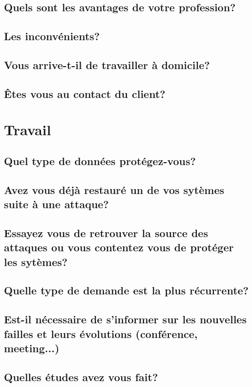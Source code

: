 \documentclass{article}
\newcommand{\Pointilles}[1][3]
{
	\multido{}{#1}{\makebox[\linewidth]{\dotfill}\\[\parskip]}
}
\begin{document}
		\subsection{Quels sont les avantages de votre profession?}
			\noindent\Pointilles[8]
		\subsection{Les inconvénients?} 
			\noindent\Pointilles[8]
		\subsection{Vous arrive-t-il de travailler à domicile?}
			\noindent\Pointilles[8]
		\subsection{Êtes vous au contact du client?}
			\noindent\Pointilles[8]
		\newpage
	\section{Travail}
		\subsection{Quel type de données protégez-vous?}
			\noindent \Pointilles[7]
		\subsection{Avez vous déjà restauré un de vos sytèmes suite à une attaque?}
			\noindent \Pointilles[7]
		\subsection{Essayez vous de retrouver la source des attaques ou vous contentez vous de protéger les sytèmes?}
			\noindent \Pointilles[6]
		\subsection{Quelle type de demande est la plus récurrente?}
			\noindent \Pointilles[6]
		\subsection{Est-il nécessaire de s'informer sur les nouvelles failles et leurs évolutions (conférence, meeting...)}
			\noindent \Pointilles[6]
		\subsection{Quelles études avez vous fait?}
			\noindent \Pointilles[6]
\end{document}
